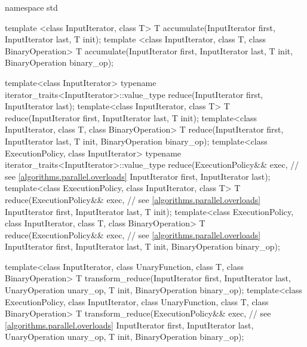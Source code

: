 %
\begin{codeblock}
namespace std {
  template <class InputIterator, class T>
    T accumulate(InputIterator first, InputIterator last, T init);
  template <class InputIterator, class T, class BinaryOperation>
    T accumulate(InputIterator first, InputIterator last, T init,
                 BinaryOperation binary_op);

  template<class InputIterator>
    typename iterator_traits<InputIterator>::value_type
      reduce(InputIterator first, InputIterator last);
  template<class InputIterator, class T>
    T reduce(InputIterator first, InputIterator last, T init);
  template<class InputIterator, class T, class BinaryOperation>
    T reduce(InputIterator first, InputIterator last, T init,
             BinaryOperation binary_op);
  template<class ExecutionPolicy, class InputIterator>
    typename iterator_traits<InputIterator>::value_type
      reduce(ExecutionPolicy&& exec, // see \ref{algorithms.parallel.overloads}
             InputIterator first, InputIterator last);
  template<class ExecutionPolicy, class InputIterator, class T>
    T reduce(ExecutionPolicy&& exec, // see \ref{algorithms.parallel.overloads}
             InputIterator first, InputIterator last, T init);
  template<class ExecutionPolicy, class InputIterator, class T, class BinaryOperation>
    T reduce(ExecutionPolicy&& exec, // see \ref{algorithms.parallel.overloads}
             InputIterator first, InputIterator last, T init,
             BinaryOperation binary_op);

  template<class InputIterator, class UnaryFunction, class T, class BinaryOperation>
    T transform_reduce(InputIterator first, InputIterator last,
                       UnaryOperation unary_op, T init, BinaryOperation binary_op);
  template<class ExecutionPolicy, class InputIterator,
           class UnaryFunction, class T, class BinaryOperation>
    T transform_reduce(ExecutionPolicy&& exec, // see \ref{algorithms.parallel.overloads}
                       InputIterator first, InputIterator last,
                       UnaryOperation unary_op, T init, BinaryOperation binary_op);

}
\end{codeblock}
